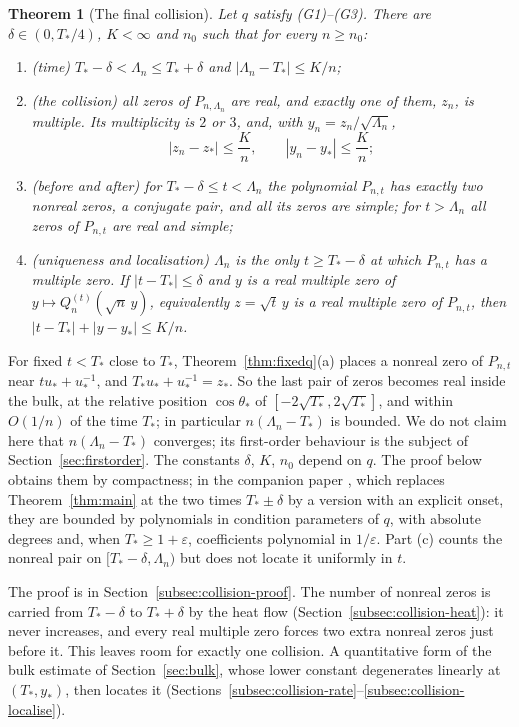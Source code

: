 \documentclass[11pt]{amsart}
\newtheorem{theorem}{Theorem}[section]
\theoremstyle{definition}
\theoremstyle{remark}
\numberwithin{equation}{section}
\newcommand{\eps}{\varepsilon}
\begin{document}
\begin{theorem}[The final collision]\label{thm:collision}
Let $q$ satisfy (G1)--(G3). There are $\delta\in(0,T_*/4)$, $K<\infty$ and $n_0$ such that for every $n\ge n_0$:
\begin{enumerate}
\item[(a)] \emph{(time)} $T_*-\delta<\Lambda_n\le T_*+\delta$ and $|\Lambda_n-T_*|\le K/n$;
\item[(b)] \emph{(the collision)} all zeros of $P_{n,\Lambda_n}$ are real, and exactly one of them, $z_n$, is multiple. Its multiplicity is $2$ or $3$, and, with $y_n=z_n/\sqrt{\Lambda_n}$,
\[
|z_n-z_*|\le\frac Kn,\qquad|y_n-y_*|\le\frac Kn ;
\]
\item[(c)] \emph{(before and after)} for $T_*-\delta\le t<\Lambda_n$ the polynomial $P_{n,t}$ has exactly two nonreal zeros, a conjugate pair, and all its zeros are simple; for $t>\Lambda_n$ all zeros of $P_{n,t}$ are real and simple;
\item[(d)] \emph{(uniqueness and localisation)} $\Lambda_n$ is the only $t\ge T_*-\delta$ at which $P_{n,t}$ has a multiple zero. If $|t-T_*|\le\delta$ and $y$ is a real multiple zero of $y\mapsto Q_n^{(t)}(\sqrt n\,y)$, equivalently $z=\sqrt t\,y$ is a real multiple zero of $P_{n,t}$, then $|t-T_*|+|y-y_*|\le K/n$.
\end{enumerate}
\end{theorem}

For fixed $t<T_*$ close to $T_*$, Theorem~\ref{thm:fixedq}(a) places a nonreal zero of $P_{n,t}$ near $tu_*+u_*^{-1}$, and $T_*u_*+u_*^{-1}=z_*$. So the last pair of zeros becomes real inside the bulk, at the relative position $\cos\theta_*$ of $[-2\sqrt{T_*},2\sqrt{T_*}]$, and within $O(1/n)$ of the time $T_*$; in particular $n(\Lambda_n-T_*)$ is bounded. We do not claim here that $n(\Lambda_n-T_*)$ converges; its first-order behaviour is the subject of Section~\ref{sec:firstorder}. The constants $\delta$, $K$, $n_0$ depend on $q$. The proof below obtains them by compactness; in the companion paper \cite{CompA}, which replaces Theorem~\ref{thm:main} at the two times $T_*\pm\delta$ by a version with an explicit onset, they are bounded by polynomials in condition parameters of $q$, with absolute degrees and, when $T_*\ge1+\eps$, coefficients polynomial in $1/\eps$. Part (c) counts the nonreal pair on $[T_*-\delta,\Lambda_n)$ but does not locate it uniformly in $t$. %

The proof is in Section~\ref{subsec:collision-proof}. The number of nonreal zeros is carried from $T_*-\delta$ to $T_*+\delta$ by the heat flow (Section~\ref{subsec:collision-heat}): it never increases, and every real multiple zero forces two extra nonreal zeros just before it. This leaves room for exactly one collision. A quantitative form of the bulk estimate of Section~\ref{sec:bulk}, whose lower constant degenerates linearly at $(T_*,y_*)$, then locates it (Sections~\ref{subsec:collision-rate}--\ref{subsec:collision-localise}).
\end{document}
